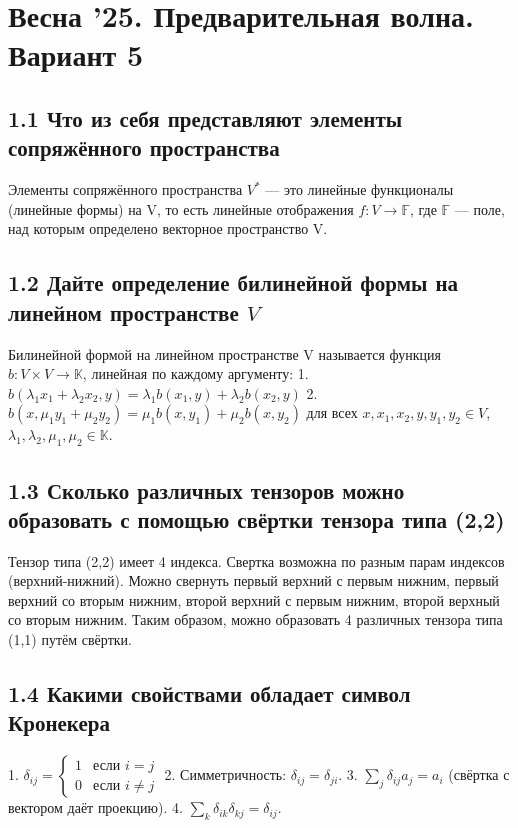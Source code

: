 \documentclass{article}
\begin{document}
\newpage

\section*{Весна '25. Предварительная волна. Вариант 5}

\subsection*{1.1 Что из себя представляют элементы сопряжённого пространства}
Элементы сопряжённого пространства \( V^* \) — это линейные функционалы (линейные формы) на V, то есть линейные отображения \( f : V \rightarrow \mathbb{F} \), где \( \mathbb{F} \) — поле, над которым определено векторное пространство V.

\subsection*{1.2 Дайте определение билинейной формы на линейном пространстве \( V \)}
Билинейной формой на линейном пространстве V называется функция \( b : V \times V \rightarrow \mathbb{K} \), линейная по каждому аргументу:
1. \( b(\lambda_1 x_1 + \lambda_2 x_2, y) = \lambda_1 b(x_1, y) + \lambda_2 b(x_2, y) \)
2. \( b(x, \mu_1 y_1 + \mu_2 y_2) = \mu_1 b(x, y_1) + \mu_2 b(x, y_2) \)
для всех \( x, x_1, x_2, y, y_1, y_2 \in V \), \( \lambda_1, \lambda_2, \mu_1, \mu_2 \in \mathbb{K} \).

\subsection*{1.3 Сколько различных тензоров можно образовать с помощью свёртки тензора типа (2,2)}
Тензор типа (2,2) имеет 4 индекса. Свертка возможна по разным парам индексов (верхний-нижний). Можно свернуть первый верхний с первым нижним, первый верхний со вторым нижним, второй верхний с первым нижним, второй верхный со вторым нижним. Таким образом, можно образовать 4 различных тензора типа (1,1) путём свёртки.

\subsection*{1.4 Какими свойствами обладает символ Кронекера}
1. \( \delta_{ij} = \begin{cases} 1 & \text{если } i = j \\ 0 & \text{если } i \neq j \end{cases} \)
2. Симметричность: \( \delta_{ij} = \delta_{ji} \).
3. \( \sum_j \delta_{ij} a_j = a_i \) (свёртка с вектором даёт проекцию).
4. \( \sum_k \delta_{ik} \delta_{kj} = \delta_{ij} \).
\end{document}
